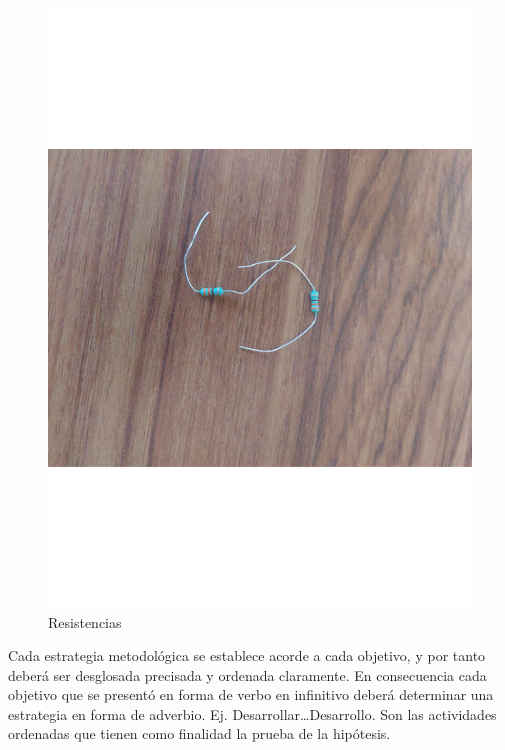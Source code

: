    \begin{figure}[H]
        \centering
        \includegraphics[trim = {30mm 30mm 30mm 30mm},clip,scale=0.2]{10/Img/resistencias.pdf}
        \caption{Resistencias}
        \label{Resistencias}
    \end{figure}
    
    
    
    
    
    
    
    Cada estrategia metodológica se establece acorde a cada objetivo, y por tanto deberá ser desglosada precisada y ordenada claramente. En consecuencia cada objetivo que se presentó en forma de verbo en infinitivo deberá determinar una estrategia en forma de adverbio. Ej. Desarrollar…Desarrollo. Son las actividades ordenadas que tienen como finalidad la prueba de la hipótesis. 
    
